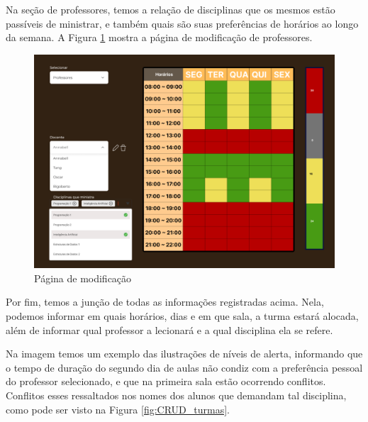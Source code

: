     Na seção de professores, temos a relação de disciplinas que os mesmos estão passíveis de ministrar, e também quais são suas preferências de horários ao longo da semana. A Figura \ref{fig:CRUD_professores} mostra a página de modificação de professores.

    \begin{figure}[htbp]\centering
        \caption{\label{fig:CRUD_professores} Página de modificação}
        \includegraphics[scale=0.6]{files/img/Prototipo/Medio/CRUD_professores.png}
    \end{figure} %

    Por fim, temos a junção de todas as informações registradas acima. Nela, podemos informar em quais horários, dias e em que sala, a turma estará alocada, além de informar qual professor a lecionará e a qual disciplina ela se refere.

    Na imagem temos um exemplo das ilustrações de níveis de alerta, informando que o tempo de duração do segundo dia de aulas não condiz com a preferência pessoal do professor selecionado, e que na primeira sala estão ocorrendo conflitos. Conflitos esses ressaltados nos nomes dos alunos que demandam tal disciplina, como pode ser visto na Figura \ref{fig:CRUD_turmas}.

